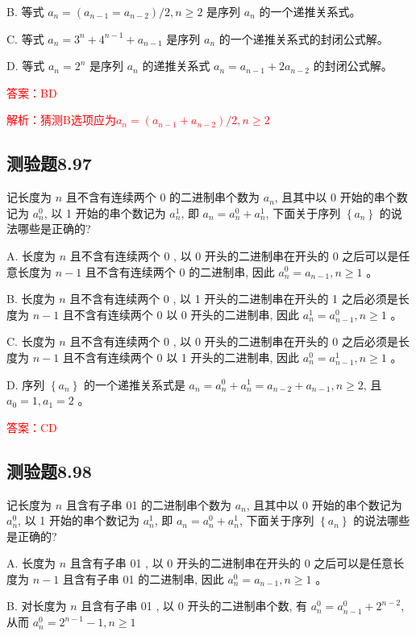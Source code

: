 \documentclass[UTF8, heading=true]{ctexart}
\begin{document}
B. 等式 $a_n=\left(a_{n-1}=a_{n-2}\right) / 2, n \geq 2$ 是序列 $a_n$ 的一个递推关系式。

C. 等式 $a_n=3^n+4^{n-1}+a_{n-1}$ 是序列 $a_n$ 的一个递推关系式的封闭公式解。

D. 等式 $a_n=2^n$ 是序列 $a_n$ 的递推关系式 $a_n=a_{n-1}+2 a_{n-2}$ 的封闭公式解。

\textcolor{red}{答案：BD}

\textcolor{red}{解析：猜测B选项应为$a_n=\left(a_{n-1}+a_{n-2}\right) / 2, n \geq 2$}

\subsection{测验题8.97}

记长度为 $n$ 且不含有连续两个 0 的二进制串个数为 $a_n$, 且其中以 0 开始的串个数记为 $a_n^0$, 以 1 开始的串个数记为 $a_n^1$, 即 $a_n=a_n^0+a_n^1$, 下面关于序列 $\left\{a_n\right\}$ 的说法哪些是正确的?

A. 长度为 $n$ 且不含有连续两个 0 , 以 0 开头的二进制串在开头的 0 之后可以是任意长度为 $n-1$ 且不含有连续两个 0 的二进制串, 因此 $a_n^0=a_{n-1}, n \geq 1$ 。

B. 长度为 $n$ 且不含有连续两个 0 , 以 1 开头的二进制串在开头的 1 之后必须是长度为 $n-1$ 且不含有连续两个 0 以 0 开头的二进制串, 因此 $a_n^1=a_{n-1}^0, n \geq 1$ 。

C. 长度为 $n$ 且不含有连续两个 0 , 以 0 开头的二进制串在开头的 0 之后必须是长度为 $n-1$ 且不含有连续两个 0 以 1 开头的二进制串, 因此 $a_n^0=a_{n-1}^1, n \geq 1$ 。

D. 序列 $\left\{a_n\right\}$ 的一个递推关系式是 $a_n=a_n^0+a_n^1=a_{n-2}+a_{n-1}, n \geq 2$, 且 $a_0=1, a_1=2$ 。

\textcolor{red}{答案：CD}

\subsection{测验题8.98}

记长度为 $n$ 且含有子串 01 的二进制串个数为 $a_n$, 且其中以 0 开始的串个数记为 $a_n^0$, 以 1 开始的串个数记为 $a_n^1$, 即 $a_n=a_n^0+a_n^1$, 下面关于序列 $\left\{a_n\right\}$ 的说法哪些是正确的?

A. 
长度为 $n$ 且含有子串 01 , 以 0 开头的二进制串在开头的 0 之后可以是任意长度为 $n-1$ 且含有子串 01 的二进制串, 因此 $a_n^0=a_{n-1}, n \geq 1$ 。

B. 
对长度为 $n$ 且含有子串 01 , 以 0 开头的二进制串个数, 有 $a_n^0=a_{n-1}^0+2^{n-2}$, 从而 $a_n^0=2^{n-1}-1, n \geq 1$
\end{document}
